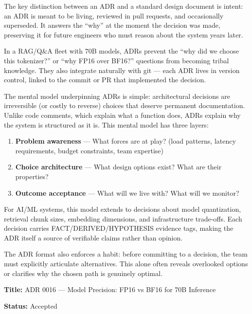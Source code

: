 The key distinction between an ADR and a standard design document is
intent: an ADR is meant to be living, reviewed in pull requests, and
occasionally superseded. It answers the ``why'' at the moment the
decision was made, preserving it for future engineers who must reason
about the system years later.

In a RAG/Q\&A fleet with 70B models, ADRs prevent the ``why did we
choose this tokenizer?'' or ``why FP16 over BF16?'' questions from
becoming tribal knowledge. They also integrate naturally with git ---
each ADR lives in version control, linked to the commit or PR that
implemented the decision.

\label{mental-model}


The mental model underpinning ADRs is simple: architectural decisions
are irreversible (or costly to reverse) choices that deserve permanent
documentation. Unlike code comments, which explain what a function does,
ADRs explain why the system is structured as it is. This mental model
has three layers:

\begin{enumerate}
\def\labelenumi{\arabic{enumi}.}
\tightlist
\item
  \textbf{Problem awareness} --- What forces are at play? (load
  patterns, latency requirements, budget constraints, team expertise)
\item
  \textbf{Choice architecture} --- What design options exist? What are
  their properties?
\item
  \textbf{Outcome acceptance} --- What will we live with? What will we
  monitor?
\end{enumerate}

For AI/ML systems, this model extends to decisions about model
quantization, retrieval chunk sizes, embedding dimensions, and
infrastructure trade-offs. Each decision carries FACT/DERIVED/HYPOTHESIS
evidence tags, making the ADR itself a source of verifiable claims
rather than opinion.

The ADR format also enforces a habit: before committing to a decision,
the team must explicitly articulate alternatives. This alone often
reveals overlooked options or clarifies why the chosen path is genuinely
optimal.

\label{worked-example-model-shape-adr}


\textbf{Title:} ADR 0016 --- Model Precision: FP16 vs BF16 for 70B
Inference

\textbf{Status:} Accepted

